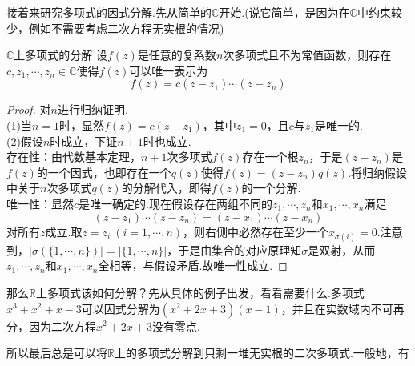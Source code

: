 \documentclass[lang=cn, zihao=5]{elegantbook}
\newcommand{\R}{\mathbb{R}}
\newcommand{\C}{\mathbb{C}}
\begin{document}
接着来研究多项式的因式分解.先从简单的$\C$开始.(说它简单，是因为在$\C$中约束较少，例如不需要考虑二次方程无实根的情况)

\begin{proposition}{$\C$上多项式的分解}
	设$f(z)$是任意的复系数$n$次多项式且不为常值函数，则存在$c,z_1,\cdots ,z_n \in \C$使得$f(z)$可以唯一表示为$$f(z) = c(z-z_1) \cdots (z-z_n)$$
\end{proposition}
\begin{proof}
	对$n$进行归纳证明. \\
	(1)当$n=1$时，显然$f(z)=c(z-z_1)$，其中$z_1=0$，且$c$与$z_1$是唯一的. \\
	(2)假设$n$时成立，下证$n+1$时也成立. \\
	存在性：由代数基本定理，$n+1$次多项式$f(z)$存在一个根$z_n$，于是$(z-z_n)$是$f(z)$的一个因式，也即存在一个$q(z)$使得$f(z)=(z-z_n)q(z)$.将归纳假设中关于$n$次多项式$q(z)$的分解代入，即得$f(z)$的一个分解. \\
	唯一性：显然$c$是唯一确定的.现在假设存在两组不同的$z_1, \cdots ,z_n$和$x_1, \cdots ,x_n$满足$$(z-z_1) \cdots (z-z_n) = (z-x_1) \cdots (z-x_n)$$
	对所有$z$成立.取$z=z_i~(i=1,\cdots ,n)$，则右侧中必然存在至少一个$x_{\sigma (i)}=0$.注意到，$|\sigma (\{ 1, \cdots ,n \})| = |\{ 1,\cdots ,n \}|$，于是由集合的对应原理知$\sigma$是双射，从而$z_1, \cdots ,z_n$和$x_1, \cdots ,x_n$全相等，与假设矛盾.故唯一性成立.
\end{proof}

那么$\R$上多项式该如何分解？先从具体的例子出发，看看需要什么.多项式$x^3+x^2+x-3$可以因式分解为$(x^2+2x+3)(x-1)$，并且在实数域内不可再分，因为二次方程$x^2+2x+3$没有零点.

所以最后总是可以将$\R$上的多项式分解到只剩一堆无实根的二次多项式.一般地，有
\end{document}
